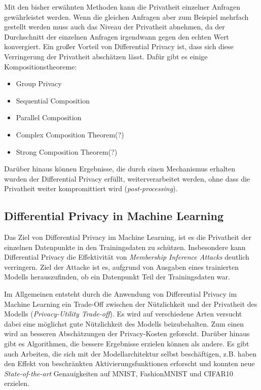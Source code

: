 Mit den bisher erwähnten Methoden kann die Privatheit einzelner Anfragen gewährleistet werden. Wenn die gleichen Anfragen aber zum Beispiel mehrfach gestellt werden muss auch das Niveau der Privatheit abnehmen, da der Durchschnitt der einzelnen Anfragen irgendwann gegen den echten Wert konvergiert.\cite[p.42]{dwork:2014} Ein großer Vorteil von Differential Privacy ist, dass sich diese Verringerung der Privatheit abschätzen lässt. Dafür gibt es einige Kompositionstheoreme:

\begin{itemize}
	\item Group Privacy
	\item Sequential Composition
	\item Parallel Composition
	\item Complex Composition Theorem(?)
	\item Strong Composition Theorem(?)\cite{dwork:2010}
\end{itemize}

Darüber hinaus können Ergebnisse, die durch einen Mechanismus erhalten wurden der Differential Privacy erfüllt, weiterverarbeitet werden, ohne dass die Privatheit weiter kompromittiert wird (\textit{post-processing}).\cite{dwork:2014}

\subsection{Differential Privacy in Machine Learning}
Das Ziel von Differential Privacy im Machine Learning, ist es die Privatheit der einzelnen Datenpunkte in den Trainingsdaten zu schützen. Insbesondere kann Differential Privacy die Effektivität von \textit{Membership Inference Attacks}\cite{shokri:2017} deutlich verringern.\cite[p.14f]{chang:2023} Ziel der Attacke ist es, aufgrund von Ausgaben eines trainierten Modells herauszufinden, ob ein Datenpunkt Teil der Trainingsdaten war.

Im Allgemeinen entsteht durch die Anwendung von Differential Privacy im Machine Learning ein Trade-Off zwischen der Nützlichkeit und der Privatheit des Modells (\textit{Privacy-Utility Trade-off}). Es wird auf verschiedene Arten versucht dabei eine möglichst gute Nützlichkeit des Modells beizubehalten. Zum einen wird an besseren Abschätzungen der Privacy-Kosten geforscht\cite{abadi:2016}. Darüber hinaus gibt es Algorithmen, die bessere Ergebnisse erzielen können als andere\cite{papernot:2017}. Es gibt auch Arbeiten, die sich mit der Modellarchitektur selbst beschäftigen, z.B. haben \textcite{papernot:2021} den Effekt von beschränkten Aktivierungsfunktionen erforscht und konnten neue \textit{State-of-the-art} Genauigkeiten auf MNIST, FashionMNIST und CIFAR10 erzielen.

